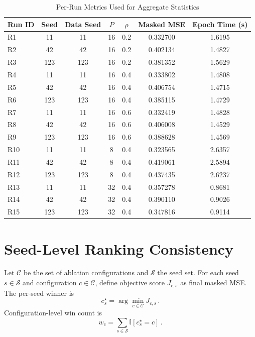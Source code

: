 \documentclass[journal]{IEEEtran}
\begin{document}
\begin{table}[!t]
\caption{Per-Run Metrics Used for Aggregate Statistics}
\label{tab:run_matrix}
\centering
\scriptsize
\begin{tabular}{lcccccc}
\toprule
Run ID & Seed & Data Seed & $P$ & $\rho$ & Masked MSE & Epoch Time (s) \\
\midrule
R1  & 11  & 11  & 16 & 0.2 & 0.332700 & 1.6195 \\
R2  & 42  & 42  & 16 & 0.2 & 0.402134 & 1.4827 \\
R3  & 123 & 123 & 16 & 0.2 & 0.381352 & 1.5629 \\
R4  & 11  & 11  & 16 & 0.4 & 0.333802 & 1.4808 \\
R5  & 42  & 42  & 16 & 0.4 & 0.406754 & 1.4715 \\
R6  & 123 & 123 & 16 & 0.4 & 0.385115 & 1.4729 \\
R7  & 11  & 11  & 16 & 0.6 & 0.332419 & 1.4828 \\
R8  & 42  & 42  & 16 & 0.6 & 0.406008 & 1.4529 \\
R9  & 123 & 123 & 16 & 0.6 & 0.388628 & 1.4569 \\
R10 & 11  & 11  & 8  & 0.4 & 0.323565 & 2.6357 \\
R11 & 42  & 42  & 8  & 0.4 & 0.419061 & 2.5894 \\
R12 & 123 & 123 & 8  & 0.4 & 0.437435 & 2.6237 \\
R13 & 11  & 11  & 32 & 0.4 & 0.357278 & 0.8681 \\
R14 & 42  & 42  & 32 & 0.4 & 0.390110 & 0.9026 \\
R15 & 123 & 123 & 32 & 0.4 & 0.347816 & 0.9114 \\
\bottomrule
\end{tabular}
\end{table}

\section{Seed-Level Ranking Consistency}
\label{app:seed_ranking}
Let $\mathcal{C}$ be the set of ablation configurations and $\mathcal{S}$ the seed set. For each seed $s\in\mathcal{S}$ and configuration $c\in\mathcal{C}$, define objective score $J_{c,s}$ as final masked MSE. The per-seed winner is
\begin{equation}
c_s^{\star}=\arg\min_{c\in\mathcal{C}} J_{c,s}\,.
\end{equation}
Configuration-level win count is
\begin{equation}
w_c = \sum_{s\in\mathcal{S}} \mathbb{I}[c_s^{\star}=c]\,.
\end{equation}
\end{document}
